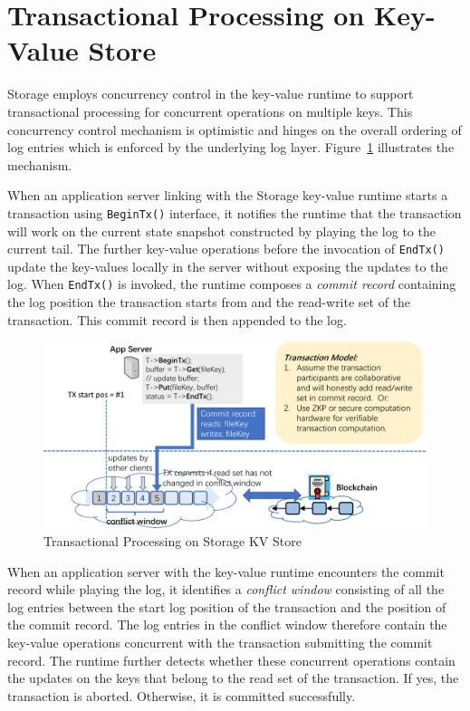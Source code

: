 \section{Transactional Processing on Key-Value Store}

\projabbrev Storage employs concurrency control in the key-value runtime to support transactional processing for concurrent operations on multiple keys. 
This concurrency control mechanism is optimistic and hinges on the overall ordering of log entries which is enforced by the underlying log layer. 
Figure~\ref{fig:tx} illustrates the mechanism.

When an application server linking with the \projabbrev Storage key-value runtime starts a transaction using \texttt{BeginTx()} interface, it notifies the runtime that the transaction will work on the current state snapshot constructed by playing the log to the current tail.
The further key-value operations before the invocation of \texttt{EndTx()} update the key-values locally in the server without exposing the updates to the log. 
When \texttt{EndTx()} is invoked, the runtime composes a \emph{commit record} containing the log position the transaction starts from and the read-write set of the transaction.  
This commit record is then appended to the log.

\begin{figure}[H]	
	\includegraphics[width=\textwidth]{figure/tx-crop.pdf}
	\caption{Transactional Processing on \projabbrev Storage KV Store}
	\label{fig:tx}
\end{figure}
 
When an application server with the key-value runtime encounters the commit record while playing the log, it identifies a \emph{conflict window} consisting of all the log entries between the start log position of the transaction and the position of the commit record. 
The log entries in the conflict window therefore contain the key-value operations concurrent with the transaction submitting the commit record. 
The runtime further detects whether these concurrent operations contain the updates on the keys that belong to the read set of the transaction.
If yes, the transaction is aborted. Otherwise, it is committed successfully.

